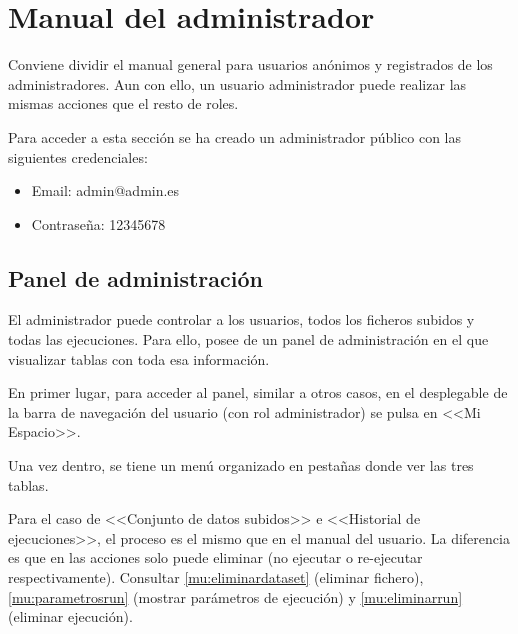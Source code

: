 

\section{Manual del administrador}

Conviene dividir el manual general para usuarios anónimos y registrados de los
administradores. Aun con ello, un usuario administrador puede realizar las
mismas acciones que el resto de roles.

Para acceder a esta sección se ha creado un administrador público con las
siguientes credenciales:
\begin{itemize}
    \item Email: admin@admin.es
    \item Contraseña: 12345678
\end{itemize}

\subsection{Panel de administración}

El administrador puede controlar a los usuarios, todos los ficheros subidos y
todas las ejecuciones. Para ello, posee de un panel de administración en el que
visualizar tablas con toda esa información.

En primer lugar, para acceder al panel, similar a otros casos, en el desplegable
de la barra de navegación del usuario (con rol administrador) se pulsa en <<Mi
Espacio>>.


Una vez dentro, se tiene un menú organizado en pestañas donde ver las tres tablas.




Para el caso de <<Conjunto de datos subidos>> e <<Historial de ejecuciones>>, el
proceso es el mismo que en el manual del usuario. La diferencia es que en las
acciones solo puede eliminar (no ejecutar o re-ejecutar respectivamente).
Consultar \ref{mu:eliminardataset} (eliminar fichero), \ref{mu:parametrosrun}
(mostrar parámetros de ejecución) y \ref{mu:eliminarrun} (eliminar ejecución).

